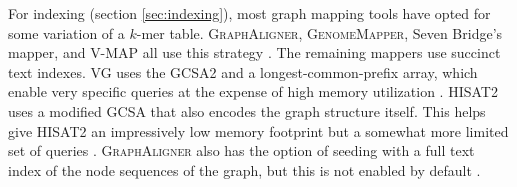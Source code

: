 For indexing (section \ref{sec:indexing}), most graph mapping tools have opted for some variation of a $k$-mer table. 
\textsc{GraphAligner}, \textsc{GenomeMapper}, Seven Bridge's mapper, and \textsc{V-MAP} all use this strategy \cite{Rautiainen_2019b, Schneeberger_2009, Rakocevic_2019, Vaddadi_2019}. 
The remaining mappers use succinct text indexes.
\textsc{VG} uses the GCSA2 \cite{Siren_2017} and a longest-common-prefix array, which enable very specific queries at the expense of high memory utilization \cite{Garrison_2019}.
\textsc{HISAT2} uses a modified GCSA \cite{Siren_2014} that also encodes the graph structure itself.
This helps give \textsc{HISAT2} an impressively low memory footprint but a somewhat more limited set of queries \cite{Kim_2019}.
\textsc{GraphAligner} also has the option of seeding with a full text index of the node sequences of the graph, but this is not enabled by default \cite{Rautiainen_2019b}.


